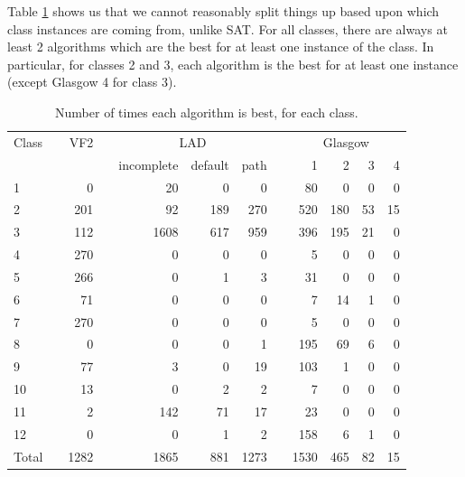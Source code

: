 \documentclass{llncs}
\begin{document}
Table \ref{expClass} shows us that we cannot reasonably split things up based upon which class instances are coming from, unlike SAT. For all classes, there are always at least 2 algorithms which are the best for at least one instance of the class. In particular, for classes 2 and 3, each algorithm is the best for at least one instance (except Glasgow 4 for class 3).

\begin{table}[t]
\begin{center}
\begin{tabularx}{.8\textwidth}{XXrXrrrXrrrr}
\toprule
Class && VF2 && \multicolumn{3}{c}{LAD} && \multicolumn{4}{c}{\hspace*{2em}Glasgow}\\
&&&&incomplete&default&path&&1&2&3&4\\
\midrule
1 &&        0 &&       20 &        0 &        0 &&       80 &        0 &        0 &        0 \\
2 &&      201 &&       92 &      189 &      270 &&      520 &      180 &       53 &       15 \\
3 &&      112 &&     1608 &      617 &      959 &&      396 &      195 &       21 &        0 \\
4 &&      270 &&        0 &        0 &        0 &&        5 &        0 &        0 &        0 \\
5 &&      266 &&        0 &        1 &        3 &&       31 &        0 &        0 &        0 \\
6 &&       71 &&        0 &        0 &        0 &&        7 &       14 &        1 &        0 \\
7 &&      270 &&        0 &        0 &        0 &&        5 &        0 &        0 &        0 \\
8 &&        0 &&        0 &        0 &        1 &&      195 &       69 &        6 &        0 \\
9 &&       77 &&        3 &        0 &       19 &&      103 &        1 &        0 &        0 \\
10 &&       13 &&        0 &        2 &        2 &&        7 &        0 &        0 &        0 \\
11 &&        2 &&      142 &       71 &       17 &&       23 &        0 &        0 &        0 \\
12 &&        0 &&        0 &        1 &        2 &&      158 &        6 &        1 &        0 \\
\midrule
Total && 1282 && 1865 & 881 & 1273 && 1530 & 465 & 82& 15\\
\bottomrule
\end{tabularx}
\end{center}
\caption{Number of times each algorithm is best, for each class.\label{expClass}}
\end{table}
\end{document}
